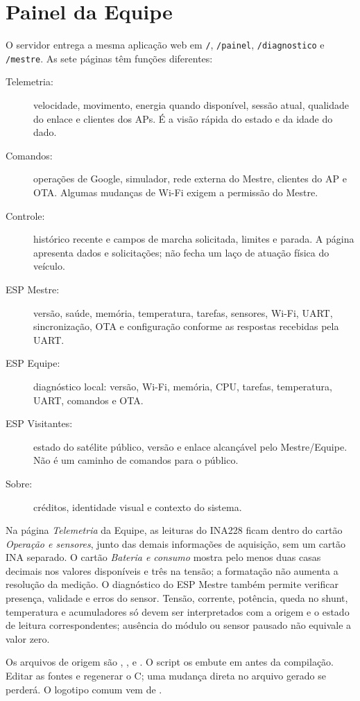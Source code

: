\section{Painel da Equipe}\label{sec:painel-equipe}
O servidor entrega a mesma aplicação web em \texttt{/}, \texttt{/painel}, \texttt{/diagnostico} e \texttt{/mestre}. As sete páginas têm funções diferentes:
\begin{description}
  \item[Telemetria:] velocidade, movimento, energia quando disponível, sessão atual, qualidade do enlace e clientes dos APs. É a visão rápida do estado e da idade do dado.
  \item[Comandos:] operações de Google, simulador, rede externa do Mestre, clientes do AP e OTA. Algumas mudanças de Wi-Fi exigem a permissão do Mestre.
  \item[Controle:] histórico recente e campos de marcha solicitada, limites e parada. A página apresenta dados e solicitações; não fecha um laço de atuação física do veículo.
  \item[ESP Mestre:] versão, saúde, memória, temperatura, tarefas, sensores, Wi-Fi, UART, sincronização, OTA e configuração conforme as respostas recebidas pela UART.
  \item[ESP Equipe:] diagnóstico local: versão, Wi-Fi, memória, CPU, tarefas, temperatura, UART, comandos e OTA.
  \item[ESP Visitantes:] estado do satélite público, versão e enlace alcançável pelo Mestre/Equipe. Não é um caminho de comandos para o público.
  \item[Sobre:] créditos, identidade visual e contexto do sistema.
\end{description}

Na página \emph{Telemetria} da Equipe, as leituras do INA228 ficam dentro do cartão \emph{Operação e sensores}, junto das demais informações de aquisição, sem um cartão INA separado. O cartão \emph{Bateria e consumo} mostra pelo menos duas casas decimais nos valores disponíveis e três na tensão; a formatação não aumenta a resolução da medição. O diagnóstico do ESP Mestre também permite verificar presença, validade e erros do sensor. Tensão, corrente, potência, queda no shunt, temperatura e acumuladores só devem ser interpretados com a origem e o estado de leitura correspondentes; ausência do módulo ou sensor pausado não equivale a valor zero.

Os arquivos de origem são , ,  e . O script  os embute em  antes da compilação. Editar as fontes e regenerar o C; uma mudança direta no arquivo gerado se perderá. O logotipo comum vem de .

